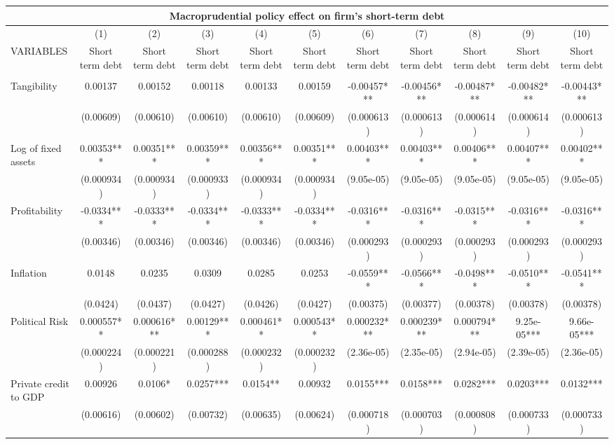 \begin{tabular}{lcccccccccc}
\multicolumn{11}{c}{Macroprudential policy effect on firm's short-term debt} \\ \hline
 & (1) & (2) & (3) & (4) & (5) & (6) & (7) & (8) & (9) & (10) \\
VARIABLES & Short term debt & Short term debt & Short term debt & Short term debt & Short term debt & Short term debt & Short term debt & Short term debt & Short term debt & Short term debt \\ \hline
 &  &  &  &  &  &  &  &  &  &  \\
Tangibility & 0.00137 & 0.00152 & 0.00118 & 0.00133 & 0.00159 & -0.00457*** & -0.00456*** & -0.00487*** & -0.00482*** & -0.00443*** \\
 & (0.00609) & (0.00610) & (0.00610) & (0.00610) & (0.00609) & (0.000613) & (0.000613) & (0.000614) & (0.000614) & (0.000613) \\
Log of fixed assets & 0.00353*** & 0.00351*** & 0.00359*** & 0.00356*** & 0.00351*** & 0.00403*** & 0.00403*** & 0.00406*** & 0.00407*** & 0.00402*** \\
 & (0.000934) & (0.000934) & (0.000933) & (0.000934) & (0.000934) & (9.05e-05) & (9.05e-05) & (9.05e-05) & (9.05e-05) & (9.05e-05) \\
Profitability & -0.0334*** & -0.0333*** & -0.0334*** & -0.0333*** & -0.0334*** & -0.0316*** & -0.0316*** & -0.0315*** & -0.0316*** & -0.0316*** \\
 & (0.00346) & (0.00346) & (0.00346) & (0.00346) & (0.00346) & (0.000293) & (0.000293) & (0.000293) & (0.000293) & (0.000293) \\
Inflation & 0.0148 & 0.0235 & 0.0309 & 0.0285 & 0.0253 & -0.0559*** & -0.0566*** & -0.0498*** & -0.0510*** & -0.0541*** \\
 & (0.0424) & (0.0437) & (0.0427) & (0.0426) & (0.0427) & (0.00375) & (0.00377) & (0.00378) & (0.00378) & (0.00378) \\
Political Risk & 0.000557** & 0.000616*** & 0.00129*** & 0.000461** & 0.000543** & 0.000232*** & 0.000239*** & 0.000794*** & 9.25e-05*** & 9.66e-05*** \\
 & (0.000224) & (0.000221) & (0.000288) & (0.000232) & (0.000232) & (2.36e-05) & (2.35e-05) & (2.94e-05) & (2.39e-05) & (2.36e-05) \\
Private credit to GDP & 0.00926 & 0.0106* & 0.0257*** & 0.0154** & 0.00932 & 0.0155*** & 0.0158*** & 0.0282*** & 0.0203*** & 0.0132*** \\
 & (0.00616) & (0.00602) & (0.00732) & (0.00635) & (0.00624) & (0.000718) & (0.000703) & (0.000808) & (0.000733) & (0.000733) \\

\end{tabular}

